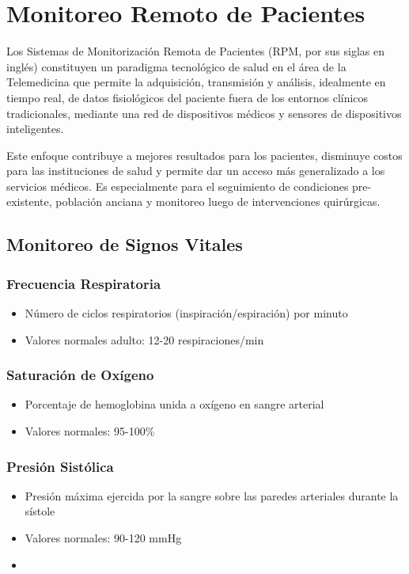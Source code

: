 \section{Monitoreo Remoto de Pacientes}

Los Sistemas de Monitorización Remota de Pacientes (RPM, por sus siglas en inglés) constituyen un paradigma tecnológico de salud en el área de la Telemedicina 
que permite la adquisición, transmisión y análisis, idealmente en tiempo real, de datos fisiológicos del paciente fuera de los entornos clínicos tradicionales, 
mediante una red de dispositivos médicos y sensores de dispositivos inteligentes. 

Este enfoque contribuye a mejores resultados para los pacientes, disminuye costos para las instituciones de salud y permite dar un acceso más 
generalizado a los servicios médicos. Es especialmente para el seguimiento de condiciones pre-existente,
población anciana y monitoreo luego de intervenciones quirúrgicas.\parencite{rpm_iot}


\subsection{Monitoreo de Signos Vitales}

\subsubsection{Frecuencia Respiratoria}
\begin{itemize}
    \item Número de ciclos respiratorios (inspiración/espiración) por minuto
    \item Valores normales adulto: 12-20 respiraciones/min
\end{itemize}

\subsubsection{Saturación de Oxígeno}
\begin{itemize}
    \item Porcentaje de hemoglobina unida a oxígeno en sangre arterial
    \item Valores normales: {95-100\%}
\end{itemize}

\subsubsection{Presión Sistólica}
\begin{itemize}
    \item Presión máxima ejercida por la sangre sobre las paredes arteriales durante la sístole
    \item Valores normales: 90-120 mmHg
    \item 
\end{itemize}

